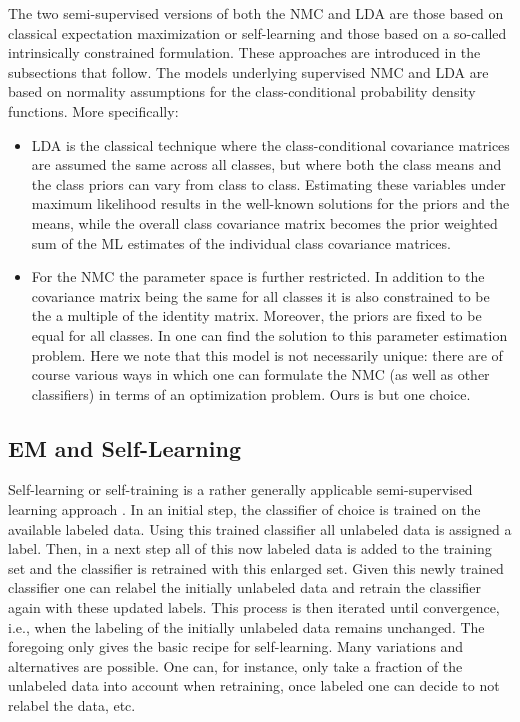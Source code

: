 \documentclass[twoside]{memoir}\usepackage[]{graphicx}\usepackage{xcolor}
\renewcommand{\cite}{\citep}
\begin{document}
The two semi-supervised versions of both the NMC and LDA are those based on classical expectation maximization or self-learning and those based on a so-called intrinsically constrained formulation.  These approaches are introduced in the subsections that follow.  The models underlying supervised NMC and LDA are based on normality assumptions for the class-conditional probability density functions.  More specifically:
\begin{itemize}

\item

LDA is the classical technique where the class-conditional covariance matrices are assumed the same across all classes, but where both the class means and the class priors can vary from class to class.  Estimating these variables under maximum likelihood results in the well-known solutions for the priors and the means, while the overall class covariance matrix becomes the prior weighted sum of the ML estimates of the individual class covariance matrices.

\item

For the NMC the parameter space is further restricted.  In addition to the covariance matrix being the same for all classes it is also constrained to be the a multiple of the identity matrix.  Moreover, the priors are fixed to be equal for all classes.  In \cite{Loog2014b} one can find the solution to this parameter estimation problem.  Here we note that this model is not necessarily unique: there are of course various ways in which one can formulate the NMC (as well as other classifiers) in terms of an optimization problem.  Ours is but one choice.

\end{itemize}


\subsection{EM and Self-Learning}



Self-learning or self-training is a rather generally applicable semi-supervised learning approach \cite{basu02a,McLachlan1975,vittaut02}.  In an initial step, the classifier of choice is trained on the available labeled data.  Using this trained classifier all unlabeled data is assigned a label.  Then, in a next step all of this now labeled data is added to the training set and the classifier is retrained with this enlarged set.  Given this newly trained classifier one can relabel the initially unlabeled data and retrain the classifier again with these updated labels.  This process is then iterated until convergence, i.e., when the labeling of the initially unlabeled data remains unchanged.  The foregoing only gives the basic recipe for self-learning.  Many variations and alternatives are possible.  One can, for instance, only take a fraction of the unlabeled data into account when retraining, once labeled one can decide to not relabel the data, etc.
\end{document}
